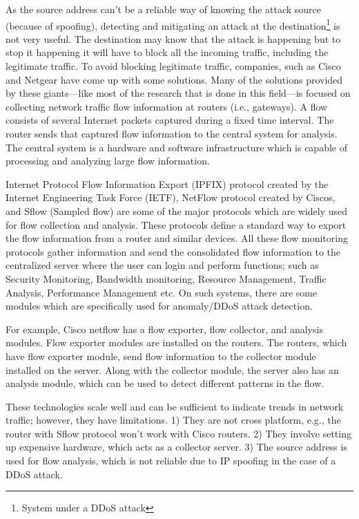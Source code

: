 \documentclass[12pt,oneside,a4paper]{article}
\begin{document}
As the source address can't be a reliable way of knowing the attack source (because of spoofing), detecting and mitigating an attack at the destination\footnote{System under a DDoS attack} is not very useful. The destination may know that the attack is happening but to stop it happening it will have to block all the incoming traffic, including the legitimate traffic. To avoid blocking legitimate traffic, companies, such as Cisco and Netgear have come up with some solutions. Many of the solutions provided by these giants---like most of the research that is done in this field---is focused on collecting network traffic flow information\cite{network-traffic-flow} at routers (i.e., gateways). A flow consists of several Internet packets captured during a fixed time interval. The router sends that captured flow information to the central system for analysis. The central system is a hardware and software infrastructure which is capable of processing and analyzing large flow information.\par

Internet Protocol Flow Information Export (IPFIX) protocol created by the Internet Engineering Task Force (IETF), NetFlow protocol created by Ciscos\cite{cisco-netflow}, and Sflow (Sampled flow)\cite{sflow} are some of the major protocols which are widely used for flow collection and analysis. These protocols define a standard way to export the flow information from a router and similar devices. All these flow monitoring protocols gather information and send the consolidated flow information to the centralized server where the user can login and perform functions; such as Security Monitoring, Bandwidth monitoring, Resource Management, Traffic Analysis, Performance Management etc. On such systems, there are some modules which are specifically used for anomaly/DDoS attack detection.\par

For example, Cisco netflow has a flow exporter, flow collector, and analysis modules. Flow exporter modules are installed on the routers. The routers, which have flow exporter module, send flow information to the collector module installed on the server. Along with the collector module, the server also has an analysis module, which can be used to detect different patterns in the flow.\par

These technologies scale well and can be sufficient to indicate trends in network traffic; however, they have limitations. 1) They are not cross platform, e.g., the router with Sflow protocol won't work with Cisco routers. 2) They involve setting up expensive hardware, which acts as a collector server. 3) The source address is used for flow analysis, which is not reliable due to IP spoofing in the case of a DDoS attack.\par
\end{document}
